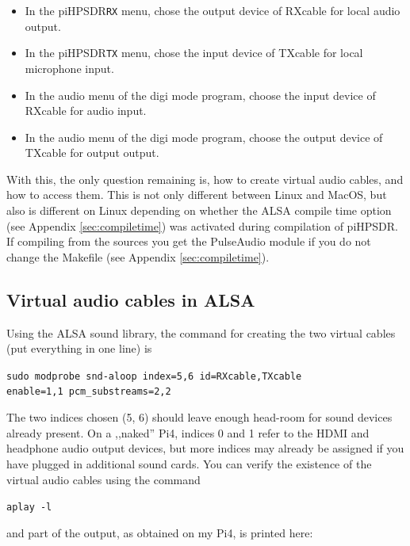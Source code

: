 \documentclass[12pt]{book}
\def\bltt#1{\texttt{\color{blue}#1}}
\def\pH{pi\-HPSDR\xspace}
\begin{document}
\begin{itemize}
\item{In the \pH \bltt{RX} menu, chose the output device of RXcable for local audio output.}
\item{In the \pH \bltt{TX} menu, chose the input device of TXcable for local microphone input.}
\item{In the audio menu of the digi mode program, choose the input device of RXcable for audio input.}
\item{In the audio menu of the digi mode program, choose the output device of TXcable for output output.}
\end{itemize}

With this, the only question remaining is, how to create virtual audio cables, and how to access them.
This is not only different between Linux and MacOS, but also is different on Linux depending on
whether the ALSA compile time option (see Appendix \ref{sec:compiletime}) was activated during
compilation of \pH. If compiling from the sources you get the PulseAudio module if you
do not change the Makefile (see Appendix \ref{sec:compiletime}).


\subsection[ALSA: virtual audio cables]{Virtual audio cables in ALSA}
Using the ALSA sound library,
the command for creating the two virtual cables (put everything in one line) is

\texttt{sudo modprobe snd-aloop index=5,6 id=RXcable,TXcable\\
enable=1,1 pcm\_substreams=2,2}

The two indices chosen (5, 6) should leave enough head-room for sound devices
already present. On a ,,naked'' Pi4, indices 0 and 1 refer to the HDMI
and headphone audio output devices, but more indices may already be assigned
if you have plugged in additional sound cards. You can verify the existence of
the virtual audio cables using the command

\texttt{aplay -l}

and part of the output, as obtained on my Pi4, is printed here:
\end{document}
